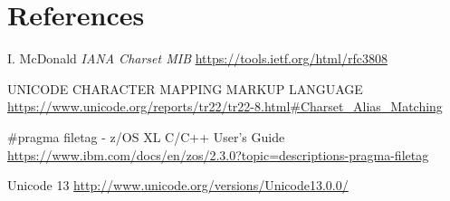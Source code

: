 \documentclass{wg21}
\begin{document}
%
%
%



\section{References}
\renewcommand{\section}[2]{}%



\begin{thebibliography}{9}

    I. McDonald
    \emph{IANA Charset MIB}\newline
    \url{https://tools.ietf.org/html/rfc3808}

    UNICODE CHARACTER MAPPING MARKUP LANGUAGE\newline
    \url{https://www.unicode.org/reports/tr22/tr22-8.html#Charset_Alias_Matching}

    \#pragma filetag -  z/OS XL C/C++ User's Guide\newline
    \url{https://www.ibm.com/docs/en/zos/2.3.0?topic=descriptions-pragma-filetag}


    Unicode 13\newline
    \url{http://www.unicode.org/versions/Unicode13.0.0/}

\end{thebibliography}
\end{document}
